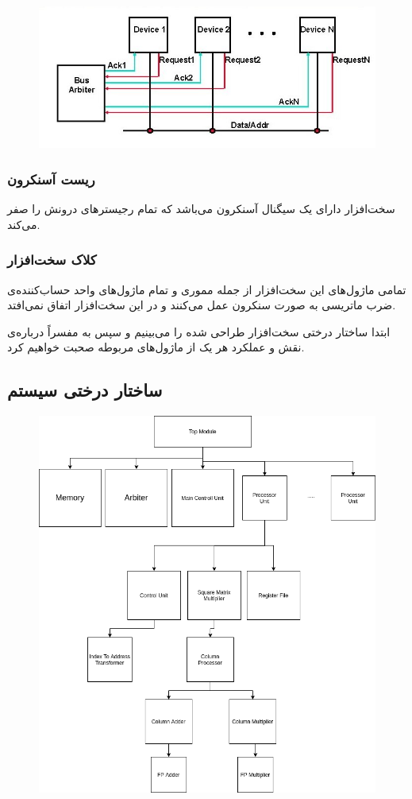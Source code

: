 \documentclass[12pt,onecolumn,a4paper,fleqn]{article}
\begin{document}
\begin{figure}[h]
	\centering
	\includegraphics[width=0.5\linewidth]{source/arbiter.jpg}
	\caption{}
	\label{arbiter}
\end{figure}

\subsubsection{ریست آسنکرون}
سخت‌افزار دارای یک سیگنال  آسنکرون می‌باشد که تمام رجیستر‌های درونش را صفر می‌کند.


\subsubsection{کلاک سخت‌‌افزار}
تمامی ماژول‌های این سخت‌افزار از جمله مموری و تمام ماژول‌های واحد حساب‌کننده‌ی ضرب ماتریسی به صورت سنکرون عمل می‌کنند و  در این سخت‌افزار اتفاق نمی‌افتد.

\pagebreak

ابتدا ساختار درختی سخت‌افزار طراحی شده را می‌بینیم و سپس به مفسراً درباره‌ی نقش و عملکرد هر یک از ماژول‌های مربوطه صحبت خواهیم کرد.
\subsection{ساختار درختی سیستم}

\begin{figure}[h]
	\centering
	\includegraphics[width=0.87\linewidth]{source/tree.png}
	\caption{}
\end{figure}
\end{document}
